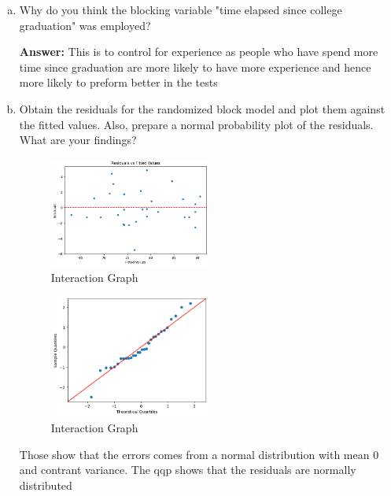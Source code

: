\documentclass{article}
\begin{document}
\begin{enumerate}[(a)]
	\item Why do you think the blocking variable "time elapsed since college graduation" was employed?

	      \textbf{Answer:} This is to control for experience as people who have spend more time since graduation
	      are more likely to have more experience and hence more likely to preform better in the tests
	\item  Obtain the residuals for the randomized block model and plot them against the fitted values. Also, prepare a normal probability plot of the residuals. What are your findings?
	      \begin{figure}[H]
		      \centering
		      \includegraphics[width=0.5\textwidth]{assets/erros.png}
		      \caption{Interaction Graph}
	      \end{figure}
	      \begin{figure}[H]
		      \centering
		      \includegraphics[width=0.5\textwidth]{assets/qqp.png}
		      \caption{Interaction Graph}
	      \end{figure}

	      Those show that the errors comes from a normal distribution with mean 0 and contrant variance. The qqp shows that the residuals are normally distributed


\end{enumerate}
\end{document}
